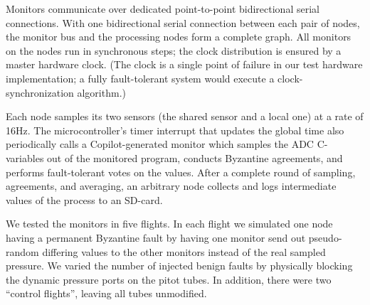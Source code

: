 

Monitors communicate over dedicated point-to-point bidirectional serial
connections.  With one bidirectional serial connection between each pair of
nodes, the monitor bus and the processing nodes form a complete graph.  All
monitors on the nodes run in synchronous steps; the clock distribution is
ensured by a master hardware clock.  (The clock is a single point of
failure in our test hardware implementation; a fully fault-tolerant
system would execute a clock-synchronization algorithm.)

Each node samples its two sensors (the shared sensor and a local one) at a rate of 16Hz.
The microcontroller's timer interrupt that updates the global time also periodically calls
a Copilot-generated monitor which samples the ADC C-variables out of the monitored program,
conducts Byzantine agreements, and performs fault-tolerant votes on the values. After 
a complete round of sampling, agreements, and averaging, an arbitrary node collects and
logs intermediate values of the process to an SD-card.


We tested the monitors in five flights. In each flight we simulated one node
having a permanent Byzantine fault by having one monitor send out pseudo-random
differing values to the other monitors instead of the real sampled pressure.  We
varied the number of injected benign faults by physically blocking the dynamic
pressure ports on the pitot tubes. In addition, there were two ``control
flights'', leaving all tubes unmodified.



